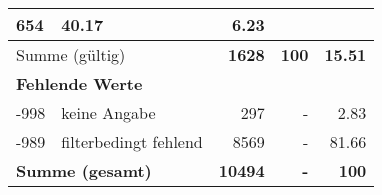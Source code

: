 \begin{longtable}{lXrrr}
       \num{654} &
       \num[round-mode=places,round-precision=2]{40,17} &
         \num[round-mode=places,round-precision=2]{6,23} \\
     \midrule
     \multicolumn{2}{l}{Summe (gültig)} &
       \textbf{\num{1628}} &
     \textbf{100} &
       \textbf{\num[round-mode=places,round-precision=2]{15,51}} \\
     \multicolumn{5}{l}{\textbf{Fehlende Werte}}\\
       -998 &
       keine Angabe &
         \num{297} &
        - &
         \num[round-mode=places,round-precision=2]{2,83} \\
       -989 &
       filterbedingt fehlend &
         \num{8569} &
        - &
         \num[round-mode=places,round-precision=2]{81,66} \\
     \midrule
     \multicolumn{2}{l}{\textbf{Summe (gesamt)}} &
          \textbf{\num{10494}} &
        \textbf{-} &
        \textbf{100} \\
     \bottomrule
     \end{longtable}
     
